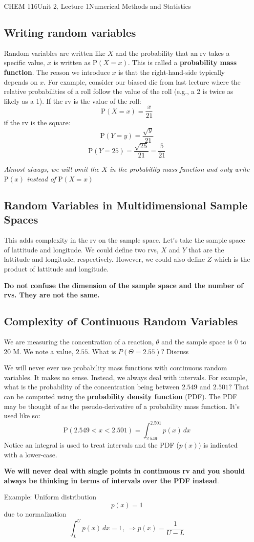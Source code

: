 \documentclass{article}
\renewcommand{\Pr}{\textrm{P}}
\begin{document}
\begin{tdoc}{CHEM 116}{Unit 2, Lecture 1}{Numerical Methods and Statistics}
\begin{itemize}
\end{itemize}

\subsection{Writing random variables}

Random variables are written like $X$ and the probability that an rv
takes a specific value, $x$ is written as $\Pr(X=x)$. This is called a
{\bf probability mass function}. The reason we introduce $x$ is that
the right-hand-side typically depends on $x$. For example, consider
our biased die from last lecture where the relative probabilities of a
roll follow the value of the roll (e.g., a 2 is twice as likely as a
1). If the rv is the value of the roll:
\[
\Pr(X=x) = \frac{x}{21}
\]
if the rv is the square:
\[
\Pr(Y=y) = \frac{\sqrt{y}}{21}
\]
\[
\Pr(Y=25) = \frac{\sqrt{25}}{21} = \frac{5}{21}
\]

\emph{Almost always, we will omit the $X$ in the probability mass
  function and only write $\Pr(x)$ instead of $\Pr(X=x)$}

\subsection{Random Variables in Multidimensional Sample Spaces}
This adds complexity in the rv on the sample space. Let's take the
sample space of lattitude and longitude. We could define two rvs, $X$
and $Y$ that are the lattitude and longitude, respectively. However,
we could also define $Z$ which is the product of lattitude and
longitude.

{\bf Do not confuse the dimension of the sample space and the number of rvs. They are not the same.}

\subsection{Complexity of Continuous Random Variables}
We are measuring the concentration of a reaction, $\theta$ and the
sample space is 0 to 20 M. We note a value, $2.55$. What is
$P(\Theta=2.55)?$ Discuss

We will never ever use probability mass functions with continuous
random variables. It makes no sense. Instead, we always deal with
intervals. For example, what is the probability of the concentration
being between $2.549$ and $2.501$? That can be computed using the {\bf
  probability density function} (PDF). The PDF may be thought of as
the pseudo-derivative of a probability mass function. It's used like so:
\[
\Pr(2.549 < x < 2.501) = \int_{2.549}^{2.501} p(x)\,dx
\]
Notice an integral is used to treat intervals and the PDF ($p(x)$) is
indicated with a lower-case.

{\bf We will never deal with single points in continuous rv and you
  should always be thinking in terms of intervals over the PDF
  instead}.

Example: Uniform distribution
\[
p(x) = 1
\]
due to normalization
\[
\int_L^U p(x) \,dx = 1,\:\Rightarrow p(x) = \frac{1}{U-L}
\]


\end{tdoc}
\end{document}
